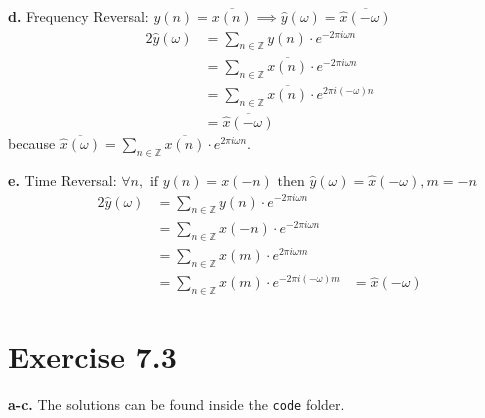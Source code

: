 \documentclass[12pt]{article}
\newcommand{\inte}{\mathbb{Z}}
\newcommand{\een}{\ensuremath{e^{-2\pi i \omega n}}}
\begin{document}
	
	\textbf{d.} Frequency Reversal: $y(n) = \overline{x(n)} \implies \hat{y}(\omega) = \overline{\hat{x}(-\omega)}$
	\begin{alignat*}{2}
		\hat{y}(\omega) &= \sum_{n \in \inte} y(n) \cdot \een\\
		&= \sum_{n \in \inte} \overline{x(n)} \cdot \een\\
		&= \sum_{n \in \inte} \overline{x(n)} \cdot e^{2\pi i (-\omega) n}\\
		&= \overline{\hat{x}(-\omega)}
	\end{alignat*}
	because $\overline{\hat{x}(\omega)} = \sum_{n \in \inte} \overline{x(n)} \cdot e^{2\pi i \omega n}$.
	
	
	\textbf{e.} Time Reversal: $ \forall n, \text{ if } y(n) = x(-n) \text{ then } \hat{y}(\omega) = \hat{x}(-\omega), m = -n$
	\begin{alignat*}{2}
		\hat{y}(\omega) &= \sum_{n \in \inte} y(n) \cdot \een\\
		&= \sum_{n \in \inte} x(-n) \cdot \een\\
		&= \sum_{n \in \inte} x(m) \cdot e^{2\pi i \omega m}\\
		&= \sum_{n \in \inte} x(m) \cdot e^{-2\pi i (-\omega) m}
		&= \hat{x}(-\omega)
	\end{alignat*}
	\section*{Exercise 7.3}
	\textbf{a-c.} The solutions can be found inside the \texttt{code} folder.
\end{document}
